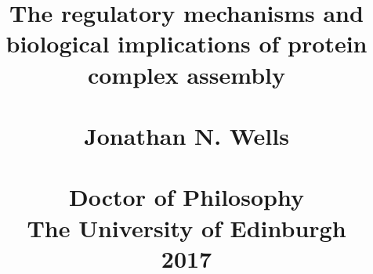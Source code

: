 \documentclass[a4paper,11pt,twoside,openright]{book}
\begin{document}
\title{The regulatory mechanisms and biological implications of protein complex assembly \\~\\
\normalsize
Jonathan N. Wells \\~\\
Doctor of Philosophy \\
The University of Edinburgh \\
2017}
\date{}
\maketitle





\printbibliography
\end{document}
